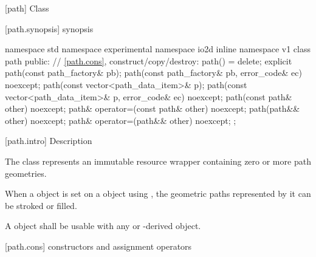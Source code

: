  [path] {Class }

 [path.synopsis] { synopsis}

\begin{codeblock}
namespace std { namespace experimental { namespace io2d { inline namespace v1 {
  class path {
    public:
    // \ref{path.cons}, construct/copy/destroy:
    path() = delete;
    explicit path(const path_factory& pb);
    path(const path_factory& pb, error_code& ec) noexcept;
    path(const vector<path_data_item>& p);
    path(const vector<path_data_item>& p, error_code& ec) noexcept;
    path(const path& other) noexcept;
    path& operator=(const path& other) noexcept;
    path(path&& other) noexcept;
    path& operator=(path&& other) noexcept;
  };
} } } }
\end{codeblock}

 [path.intro] { Description}

\pnum
{}
The  class represents an immutable resource wrapper containing zero or more path geometries.

\pnum
When a  object is set on a  object using 
, the geometric paths represented by it can be 
stroked or filled.

\pnum
A  object shall be usable with any  or -derived object.

 [path.cons] { constructors and assignment operators}

